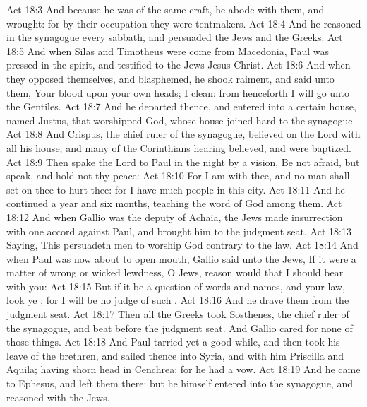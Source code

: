 \vs Act 18:3 And because he was of the same craft, he abode with them, and wrought: for by their occupation they were tentmakers.
\vs Act 18:4 And he reasoned in the synagogue every sabbath, and persuaded the Jews and the Greeks.
\vs Act 18:5 And when Silas and Timotheus were come from Macedonia, Paul was pressed in the spirit, and testified to the Jews  Jesus  Christ.
\vs Act 18:6 And when they opposed themselves, and blasphemed, he shook  raiment, and said unto them, Your blood  upon your own heads; I  clean: from henceforth I will go unto the Gentiles.
\vs Act 18:7 And he departed thence, and entered into a certain  house, named Justus,  that worshipped God, whose house joined hard to the synagogue.
\vs Act 18:8 And Crispus, the chief ruler of the synagogue, believed on the Lord with all his house; and many of the Corinthians hearing believed, and were baptized.
\vs Act 18:9 Then spake the Lord to Paul in the night by a vision, Be not afraid, but speak, and hold not thy peace:
\vs Act 18:10 For I am with thee, and no man shall set on thee to hurt thee: for I have much people in this city.
\vs Act 18:11 And he continued  a year and six months, teaching the word of God among them.
\vs Act 18:12 And when Gallio was the deputy of Achaia, the Jews made insurrection with one accord against Paul, and brought him to the judgment seat,
\vs Act 18:13 Saying, This  persuadeth men to worship God contrary to the law.
\vs Act 18:14 And when Paul was now about to open  mouth, Gallio said unto the Jews, If it were a matter of wrong or wicked lewdness, O  Jews, reason would that I should bear with you:
\vs Act 18:15 But if it be a question of words and names, and  your law, look ye ; for I will be no judge of such .
\vs Act 18:16 And he drave them from the judgment seat.
\vs Act 18:17 Then all the Greeks took Sosthenes, the chief ruler of the synagogue, and beat  before the judgment seat. And Gallio cared for none of those things.
\vs Act 18:18 And Paul  tarried  yet a good while, and then took his leave of the brethren, and sailed thence into Syria, and with him Priscilla and Aquila; having shorn  head in Cenchrea: for he had a vow.
\vs Act 18:19 And he came to Ephesus, and left them there: but he himself entered into the synagogue, and reasoned with the Jews.
